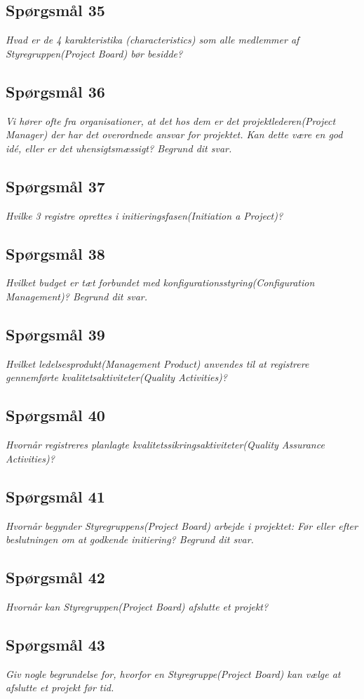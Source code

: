 \documentclass[12pt,twoside]{article}
\begin{document}
    \subsection{Sp\o{}rgsm\r{a}l 35}
    \textit{Hvad er de 4 karakteristika (characteristics) som alle medlemmer af Styregruppen(Project Board) bør besidde?}
    \subsection{Sp\o{}rgsm\r{a}l 36}
    \textit{Vi hører ofte fra organisationer, at det hos dem er det projektlederen(Project Manager) der har det overordnede ansvar for projektet. Kan dette være en god idé, eller er det uhensigtsmæssigt? Begrund dit svar.}
    \subsection{Sp\o{}rgsm\r{a}l 37}
    \textit{Hvilke 3 registre oprettes i initieringsfasen(Initiation a Project)?}
    \subsection{Sp\o{}rgsm\r{a}l 38}
    \textit{Hvilket budget er tæt forbundet med konfigurationsstyring(Configuration Management)? Begrund dit svar.}
    \subsection{Sp\o{}rgsm\r{a}l 39}
    \textit{Hvilket ledelsesprodukt(Management Product) anvendes til at registrere gennemførte kvalitetsaktiviteter(Quality Activities)?}
    \subsection{Sp\o{}rgsm\r{a}l 40}
    \textit{Hvornår registreres planlagte kvalitetssikringsaktiviteter(Quality Assurance Activities)?}
    \subsection{Sp\o{}rgsm\r{a}l 41}
    \textit{Hvornår begynder Styregruppens(Project Board) arbejde i projektet: Før eller efter beslutningen om at godkende initiering? Begrund dit svar.}
    \subsection{Sp\o{}rgsm\r{a}l 42}
    \textit{Hvornår kan Styregruppen(Project Board) afslutte et projekt?}
    \subsection{Sp\o{}rgsm\r{a}l 43}
    \textit{Giv nogle begrundelse for, hvorfor en Styregruppe(Project Board) kan vælge at afslutte et projekt før tid.}
\end{document}

